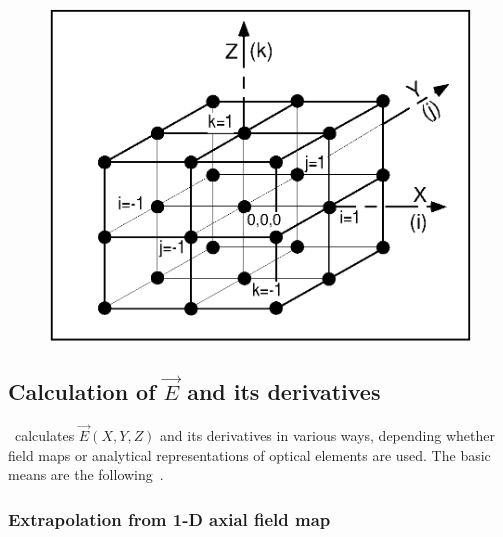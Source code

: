 \begin{figure}[H]
\centerline{\includegraphics[width=14cm]{Fig4.ps}}
\end{figure}

\subsection{Calculation of  $ \vec E $ and its derivatives} \label{sec2.5}

\zgou\ calculates $ \vec  E(X,Y,Z) $ and its derivatives in
 various ways, depending  whether field maps or analytical 
representations of optical elements are used. The  basic 
means are the following~\cite{Biblio6}.     %

\subsubsection{Extrapolation from  1-D axial field map} \label{sec2.5.1}

